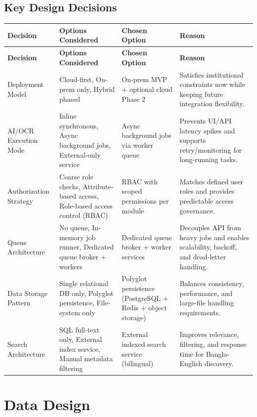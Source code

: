 \documentclass[12pt,a4paper]{article}
\begin{document}
\subsection{Key Design Decisions}
\renewcommand{\arraystretch}{1.18}
\setlength{\tabcolsep}{3.5pt}
\small
\begin{longtable}{>{\raggedright\arraybackslash}p{2.5cm} >{\raggedright\arraybackslash}p{4.0cm} >{\raggedright\arraybackslash}p{2.8cm} >{\raggedright\arraybackslash}p{5.0cm}}
    \toprule
    \textbf{Decision} & \textbf{Options Considered} & \textbf{Chosen Option} & \textbf{Reason} \\
    \midrule
    \endfirsthead
    \toprule
    \textbf{Decision} & \textbf{Options Considered} & \textbf{Chosen Option} & \textbf{Reason} \\
    \midrule
    \endhead
    Deployment Model & Cloud-first, On-prem only, Hybrid phased & On-prem MVP + optional cloud Phase 2 & Satisfies institutional constraints now while keeping future integration flexibility. \\
    AI/OCR Execution Mode & Inline synchronous, Async background jobs, External-only service & Async background jobs via worker queue & Prevents UI/API latency spikes and supports retry/monitoring for long-running tasks. \\
    Authorization Strategy & Coarse role checks, Attribute-based access, Role-based access control (RBAC) & RBAC with scoped permissions per module & Matches defined user roles and provides predictable access governance. \\
    Queue Architecture & No queue, In-memory job runner, Dedicated queue broker + workers & Dedicated queue broker + worker services & Decouples API from heavy jobs and enables scalability, backoff, and dead-letter handling. \\
    Data Storage Pattern & Single relational DB only, Polyglot persistence, File-system only & Polyglot persistence (PostgreSQL + Redis + object storage) & Balances consistency, performance, and large-file handling requirements. \\
    Search Architecture & SQL full-text only, External index service, Manual metadata filtering & External indexed search service (bilingual) & Improves relevance, filtering, and response time for Bangla-English discovery. \\
    \bottomrule
\end{longtable}
\normalsize

\section{Data Design}
\end{document}
